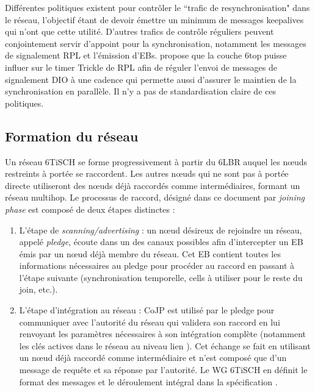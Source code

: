 \documentclass[]{report}
\begin{document}
\par Différentes politiques existent pour contrôler le ``trafic de resynchronisation" dans le réseau, l'objectif étant de devoir émettre un minimum de messages keepalives qui n'ont que cette utilité. D'autres trafics de contrôle réguliers peuvent conjointement servir d'appoint pour la synchronisation, notamment les messages de signalement RPL et l'émission d'EBs. \cite{ietf-6tisch-architecture-28} propose que la couche 6top puisse influer sur le timer Trickle de RPL afin de réguler l'envoi de messages de signalement DIO à une cadence qui permette aussi d'assurer le maintien de la synchronisation en parallèle. Il n'y a pas de standardisation claire de ces politiques.

\newpage

	\subsection{Formation du réseau}
	\label{joinphase}
	
Un réseau 6TiSCH se forme progressivement à partir du 6LBR auquel les nœuds restreints à portée se raccordent. Les autres nœuds qui ne sont pas à portée directe utiliseront des nœuds déjà raccordés comme intermédiaires, formant un réseau multihop. Le processus de raccord, désigné dans ce document par \textit{joining phase} est composé de deux étapes distinctes : 
\vspace{0.1cm}
\begin{enumerate}
\item L'étape de \textit{scanning/advertising} : un nœud désireux de rejoindre un réseau, appelé \textit{pledge}, écoute dans un des canaux possibles afin d'intercepter un EB émis par un nœud déjà membre du réseau. Cet EB contient toutes les informations nécessaires au pledge pour procéder au raccord en passant à l'étape suivante (synchronisation temporelle, cells à utiliser pour le reste du join, etc.).   
\vspace{0.1cm}
\item L'étape d'intégration au réseau : CoJP est utilisé par le pledge pour communiquer avec l'autorité du réseau qui validera son raccord en lui renvoyant les paramètres nécessaires à son intégration complète (notamment les clés actives dans le réseau au niveau lien ). Cet échange se fait en utilisant un nœud déjà raccordé comme intermédiaire et n'est composé que d'un message de requête et sa réponse par l'autorité. Le WG 6TiSCH en définit le format des messages et le déroulement intégral dans la spécification \cite{ietf-6tisch-minimal-security-15}.
\end{enumerate}
\end{document}
